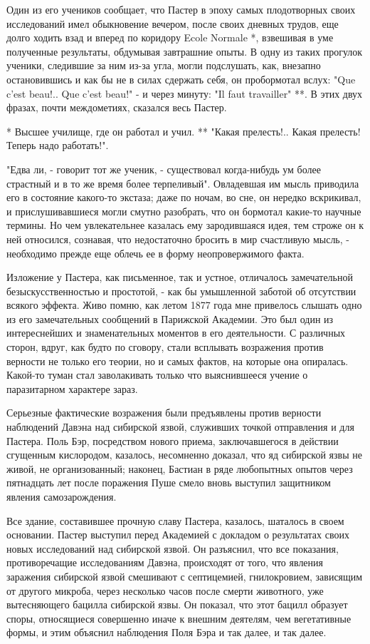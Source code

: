 Один из его  учеников сообщает,  что Пастер в  эпоху самых  плодотворных
своих исследований имел обыкновение вечером, после своих дневных трудов,
еще долго ходить взад и вперед по коридору Ecole Normale *, взвешивая  в
уме полученные результаты, обдумывая завтрашние  опыты. В одну из  таких
прогулок ученики, следившие  за ним из-за  угла, могли подслушать,  как,
внезапно остановившись и как бы не в силах сдержать себя, он пробормотал
вслух: "Que c'est beau!..  Que c'est beau!" -  и через минуту: "Il  faut
travailler"  **. В  этих двух фразах,  почти междометиях, сказался  весь
Пастер.

* Высшее училище, где он работал и учил.
** "Какая прелесть!.. Какая прелесть! Теперь надо работать!".

"Едва ли, - говорит тот же  ученик, - существовал когда-нибудь ум  более
страстный и  в  то  же  время более  терпеливый".  Овладевшая  им  мысль
приводила его в состояние какого-то экстаза;  даже по ночам, во сне,  он
нередко вскрикивал, и  прислушивавшиеся могли смутно  разобрать, что  он
бормотал какие-то  научные термины.  Но чем  увлекательнее казалась  ему
зародившаяся  идея,  тем  строже  он  к  ней  относился,  сознавая,  что
недостаточно бросить в  мир счастливую  мысль, -  необходимо прежде  еще
облечь ее в форму неопровержимого факта.

Изложение  у  Пастера,   как  письменное,  так   и  устное,   отличалось
замечательной безыскусственностью  и  простотой,  -  как  бы  умышленной
заботой об отсутствии всякого эффекта.  Живо помню, как летом 1877  года
мне привелось слышать  одно из его  замечательных сообщений в  Парижской
Академии. Это был один из интереснейших и знаменательных моментов в  его
деятельности. С различных  сторон, вдруг,  как будто  по сговору,  стали
всплывать возражения против верности  не только его  теории, но и  самых
фактов, на  которые  она  опиралась. Какой-то  туман  стал  заволакивать
только что выяснившееся учение о паразитарном характере зараз.

Серьезные  фактические  возражения  были  предъявлены  против   верности
наблюдений Давэна над  сибирской язвой, служивших  точкой отправления  и
для Пастера.  Поль  Бэр,  посредством нового  приема,  заключавшегося  в
действии сгущенным  кислородом,  казалось, несомненно  доказал,  что  яд
сибирской язвы  не живой,  не организованный;  наконец, Бастиан  в  ряде
любопытных опытов через пятнадцать лет после поражения Пуше смело  вновь
выступил защитником явления самозарождения.

Все здание,  составившее прочную  славу  Пастера, казалось,  шаталось  в
своем  основании.  Пастер   выступил  перед  Академией   с  докладом   о
результатах своих новых исследований над сибирской язвой. Он  разъяснил,
что все показания,  противоречащие исследованиям  Давэна, происходят  от
того, что  явления заражения  сибирской язвой  смешивают с  септицемией,
гнилокровием, зависящим от другого микроба, через несколько часов  после
смерти животного, уже вытесняющего  бацилла сибирской язвы. Он  показал,
что этот бацилл образует споры,  относящиеся совершенно иначе к  внешним
деятелям, чем вегетативные формы, и этим объяснил наблюдения Поля Бэра и
так далее, и так далее.

